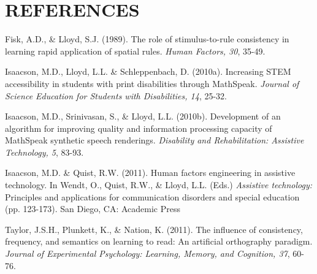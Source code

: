 \documentclass[11.5pt]{sig-alternate} %
\begin{document}
\section*{REFERENCES}\par 

\leftskip 0.25in
\parindent -0.25in 
Fisk, A.D., \& Lloyd, S.J. (1989). The role of stimulus-to-rule consistency in learning rapid application of spatial rules. \textit{Human Factors, 30}, 35-49.

Isaacson, M.D., Lloyd, L.L. \& Schleppenbach, D. (2010a). Increasing STEM accessibility in students with print disabilities through MathSpeak. \textit{Journal of Science Education for Students with Disabilities, 14}, 25-32.

Isaacson, M.D., Srinivasan, S., \& Lloyd, L.L. (2010b). Development of an algorithm for improving quality and information processing capacity of MathSpeak synthetic speech renderings. \textit{Disability and Rehabilitation: Assistive Technology, 5}, 83-93.

Isaacson, M.D. \& Quist, R.W. (2011). Human factors engineering in assistive technology.  In  Wendt, O., Quist, R.W., \& Lloyd, L.L. (Eds.) \textit{Assistive technology:} Principles and applications for communication disorders and special education (pp. 123-173). San Diego, CA: Academic Press

Taylor, J.S.H., Plunkett, K., \& Nation, K. (2011). The influence of consistency, frequency, and semantics on learning to read: An artificial orthography paradigm. \textit{Journal of Experimental Psychology: Learning, Memory, and Cognition, 37}, 60-76.
\end{document}
